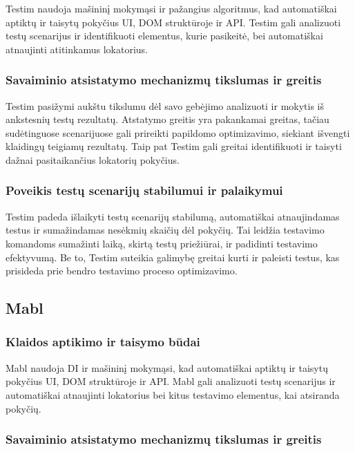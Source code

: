 \documentclass[
]{VUMIFPSkursinis}
\begin{document}
Testim naudoja mašininį mokymąsi ir pažangius algoritmus, kad automatiškai aptiktų ir taisytų pokyčius UI, DOM struktūroje ir API. Testim gali analizuoti testų scenarijus ir identifikuoti elementus, kurie pasikeitė, bei automatiškai atnaujinti atitinkamus lokatorius.

\subsubsection{Savaiminio atsistatymo mechanizmų tikslumas ir greitis}

Testim pasižymi aukštu tikslumu dėl savo gebėjimo analizuoti ir mokytis iš ankstesnių testų rezultatų. Atstatymo greitis yra pakankamai greitas, tačiau sudėtinguose scenarijuose gali prireikti papildomo optimizavimo, siekiant išvengti klaidingų teigiamų rezultatų. Taip pat Testim gali greitai identifikuoti ir taisyti dažnai pasitaikančius lokatorių pokyčius.

\subsubsection{Poveikis testų scenarijų stabilumui ir palaikymui}

Testim padeda išlaikyti testų scenarijų stabilumą, automatiškai atnaujindamas testus ir sumažindamas nesėkmių skaičių dėl pokyčių. Tai leidžia testavimo komandoms sumažinti laiką, skirtą testų priežiūrai, ir padidinti testavimo efektyvumą. Be to, Testim suteikia galimybę greitai kurti ir paleisti testus, kas prisideda prie bendro testavimo proceso optimizavimo.

\subsection{Mabl}

\subsubsection{Klaidos aptikimo ir taisymo būdai}

Mabl naudoja DI ir mašininį mokymąsi, kad automatiškai aptiktų ir taisytų pokyčius UI, DOM struktūroje ir API. Mabl gali analizuoti testų scenarijus ir automatiškai atnaujinti lokatorius bei kitus testavimo elementus, kai atsiranda pokyčių.

\subsubsection{Savaiminio atsistatymo mechanizmų tikslumas ir greitis}
\end{document}
